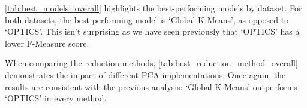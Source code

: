 \vspace{1em}

\autoref{tab:best_models_overall} highlights the best-performing models by dataset.
For both datasets, the best performing model is `Global K-Means', as opposed to `OPTICS'.
This isn't surprising as we have seen previously that `OPTICS' has a lower F-Measure score.



When comparing the reduction methods, \autoref{tab:best_reduction_method_overall} demonstrates the impact of
different PCA implementations. Once again, the results are consistent with the previous analysis:
`Global K-Means' outperforms `OPTICS' in every method. 

